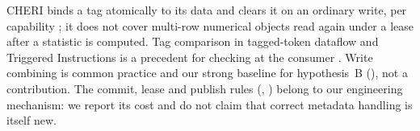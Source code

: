 %
%
CHERI binds a tag atomically to its data and clears it on an ordinary write, per capability ; it does not cover multi-row numerical objects read again under a lease after a statistic is computed.
Tag comparison in tagged-token dataflow and Triggered Instructions is a precedent for checking at the consumer .
Write combining is common practice and our strong baseline for hypothesis~B (), not a contribution.
The commit, lease and publish rules (, ) belong to our engineering mechanism: we report its cost and do not claim that correct metadata handling is itself new.
